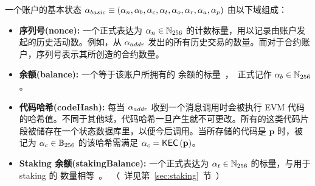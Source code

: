 一个账户的基本状态 $\mathbf{\alpha}_{basic} \equiv\left( \mathbf{\alpha}_n, \mathbf{\alpha}_b, \mathbf{\alpha}_c,\mathbf{\alpha}_t, \mathbf{\alpha}_o, \mathbf{\alpha}_r, \mathbf{\alpha}_a, \mathbf{\alpha}_p\right)$ 由以下域组成：
\begin{itemize}[nosep]
	\item {\bf 序列号(nonce):} 一个正式表达为 $\mathbf{\alpha}_n\in \mathbb{N}_{256}$ 的计数标量，用以记录由账户发起的历史活动数。例如，从 $\mathbf{\alpha}_{addr}$ 发出的所有历史交易的数量。而对于合约账户，序列号表示其所创造的合约数量。

	\item {\bf 余额(balance):} 一个等于该账户所拥有的 \unit 余额的标量，正式记作 $\mathbf{\alpha}_b\in \mathbb{N}_{256}$。

	\item {\bf 代码哈希(codeHash):} 每当 $\mathbf{\alpha}_{addr}$ 收到一个消息调用时会被执行 EVM 代码的哈希值。不同于其他域，代码哈希一旦产生就不可更改。所有的这类代码片段被储存在一个状态数据库里，以便今后调用。当所存储的代码是 $\mathbf{p}$ 时，被记为 $\mathbf{\alpha}_c\in \mathbb{B}_{256}$ 的该哈希需满足 $\mathbf{\alpha}_c=\mathsf{KEC}\left(\mathbf{p} \right)$。  

	\item {\bf Staking 余额(stakingBalance):} 一个正式表达为 $\mathbf{\alpha}_t\in \mathbb{N}_{256}$ 的标量，与用于 staking 的 \unit 数量相等。（详见第 \ref{sec:staking} 节）


\end{itemize}

